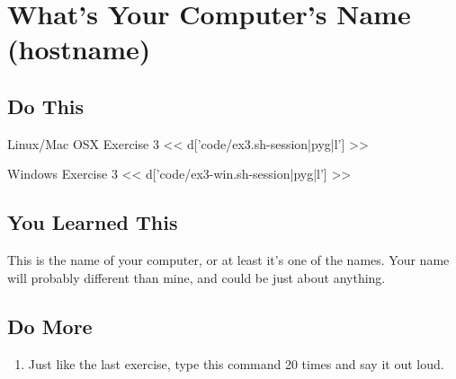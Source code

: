 \chapter{What's Your Computer's Name (hostname)}

\section{Do This}

\begin{code}{Linux/Mac OSX Exercise 3}
<< d['code/ex3.sh-session|pyg|l'] >>
\end{code}

\begin{code}{Windows Exercise 3}
<< d['code/ex3-win.sh-session|pyg|l'] >>
\end{code}

\section{You Learned This}

This is the name of your computer, or at least it's one of the names. Your 
name will probably different than mine, and could be just about anything.

\section{Do More}

\begin{enumerate}
\item Just like the last exercise, type this command 20 times and say it out loud.
\end{enumerate}

